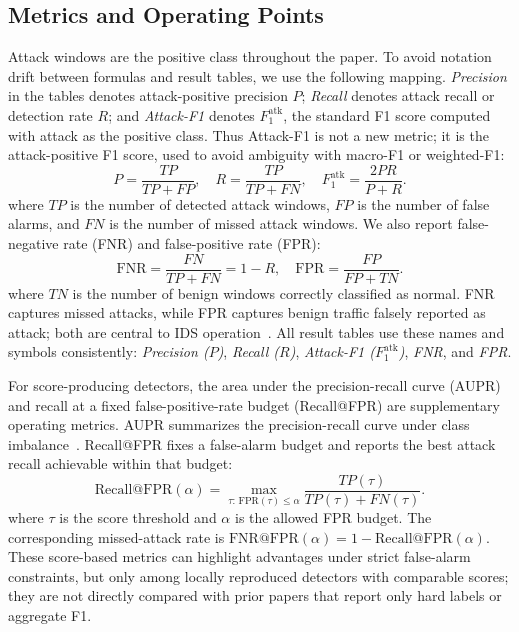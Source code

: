 \documentclass[runningheads]{llncs}
\begin{document}
\subsection{Metrics and Operating Points}
\label{sec:metrics}
Attack windows are the positive class throughout the paper. To avoid notation drift between formulas and result tables, we use the following mapping. \emph{Precision} in the tables denotes attack-positive precision \(P\); \emph{Recall} denotes attack recall or detection rate \(R\); and \emph{Attack-F1} denotes \(F_1^{\mathrm{atk}}\), the standard F1 score computed with attack as the positive class. Thus Attack-F1 is not a new metric; it is the attack-positive F1 score, used to avoid ambiguity with macro-F1 or weighted-F1:
\begin{equation}
  P = \frac{TP}{TP+FP}, \quad
  R = \frac{TP}{TP+FN}, \quad
  F_1^{\mathrm{atk}} = \frac{2PR}{P+R}.
\end{equation}
where \(TP\) is the number of detected attack windows, \(FP\) is the number of false alarms, and \(FN\) is the number of missed attack windows. We also report false-negative rate (FNR) and false-positive rate (FPR):
\begin{equation}
  \mathrm{FNR} = \frac{FN}{TP+FN} = 1-R, \quad
  \mathrm{FPR} = \frac{FP}{FP+TN}.
\end{equation}
where \(TN\) is the number of benign windows correctly classified as normal. FNR captures missed attacks, while FPR captures benign traffic falsely reported as attack; both are central to IDS operation~\cite{ulvila2003ids,gu2006cid,fawcett2006roc}. All result tables use these names and symbols consistently: \emph{Precision (\(P\))}, \emph{Recall (\(R\))}, \emph{Attack-F1 (\(F_1^{\mathrm{atk}}\))}, \emph{FNR}, and \emph{FPR}.

For score-producing detectors, the area under the precision-recall curve (AUPR) and recall at a fixed false-positive-rate budget (Recall@FPR) are supplementary operating metrics. AUPR summarizes the precision-recall curve under class imbalance~\cite{davis2006pr,saito2015pr}. Recall@FPR fixes a false-alarm budget and reports the best attack recall achievable within that budget:
\begin{equation}
  \mathrm{Recall@FPR}(\alpha) = \max_{\tau:\,\mathrm{FPR}(\tau)\leq\alpha}
  \frac{TP(\tau)}{TP(\tau)+FN(\tau)}.
\end{equation}
where \(\tau\) is the score threshold and \(\alpha\) is the allowed FPR budget. The corresponding missed-attack rate is \(\mathrm{FNR@FPR}(\alpha)=1-\mathrm{Recall@FPR}(\alpha)\). These score-based metrics can highlight advantages under strict false-alarm constraints, but only among locally reproduced detectors with comparable scores; they are not directly compared with prior papers that report only hard labels or aggregate F1.
\end{document}
